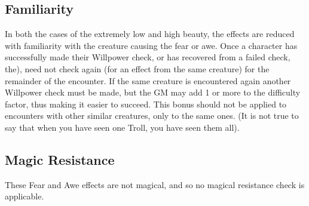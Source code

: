 \subsection{Familiarity}
In both the cases of the extremely low and high beauty, the effects
are reduced with familiarity with the creature causing the fear or
awe.  Once a character has successfully made their Willpower check, or
has recovered from a failed check, the), need not check again (for an
effect from the same creature) for the remainder of the encounter.  If
the same creature is encountered again another Willpower check must be
made, but the GM may add 1 or more to the difficulty factor, thus
making it easier to succeed.  This bonus should not be applied to
encounters with other similar creatures, only to the same ones. (It is
not true to say that when you have seen one Troll, you have seen them
all).

\subsection{Magic Resistance}
These Fear and Awe effects are not magical, and so no magical
resistance check is applicable.

